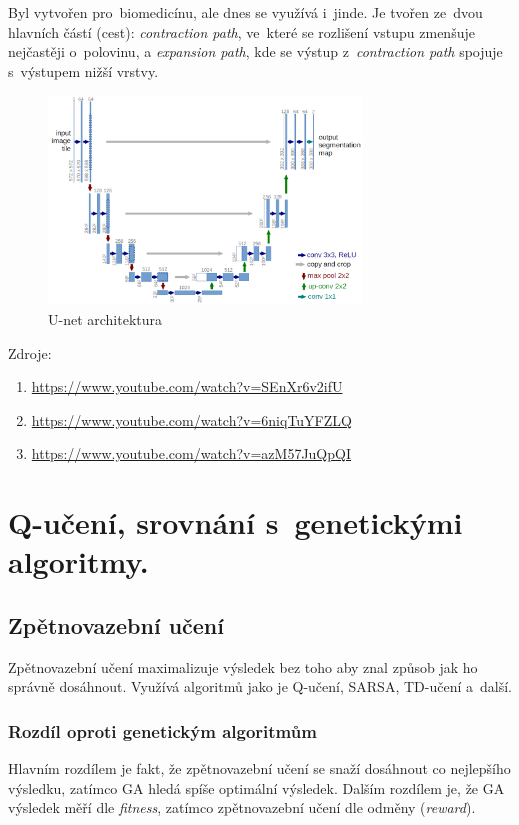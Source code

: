 Byl vytvořen pro~biomedicínu, ale dnes se využívá i~jinde.
Je tvořen ze~dvou hlavních částí (cest):
\emph{contraction path}, ve~které se rozlišení vstupu zmenšuje nejčastěji o~polovinu, a
\emph{expansion path}, kde se výstup z~\emph{contraction path} spojuje s~výstupem nižší vrstvy.

\begin{figure}[h]
    \centering
	\includegraphics[height=15em]{images/09_unet.png}
    \caption{U-net architektura}
    \label{LSTM}
\end{figure}

Zdroje:
\begin{enumerate}
    \item \url{https://www.youtube.com/watch?v=SEnXr6v2ifU}
    \item \url{https://www.youtube.com/watch?v=6niqTuYFZLQ}
    \item \url{https://www.youtube.com/watch?v=azM57JuQpQI}
\end{enumerate}


\clearpage
\section{Q-učení, srovnání s~genetickými algoritmy.}

\subsection{Zpětnovazební učení}

Zpětnovazební učení maximalizuje výsledek bez toho aby znal způsob jak ho správně dosáhnout.
Využívá algoritmů jako je Q-učení, SARSA, TD-učení a~další.

\subsubsection{Rozdíl oproti genetickým algoritmům}

Hlavním rozdílem je fakt, že zpětnovazební učení se snaží dosáhnout co nejlepšího výsledku, zatímco GA hledá spíše optimální výsledek.
Dalším rozdílem je, že GA výsledek měří dle \emph{fitness}, zatímco zpětnovazební učení dle odměny (\emph{reward}).

